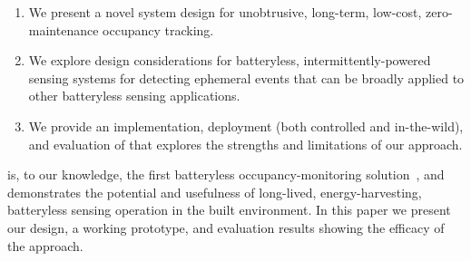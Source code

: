\begin{enumerate}[label=\arabic*., align=left, leftmargin=*]
	\item We present a novel system design for unobtrusive, long-term, low-cost, zero-maintenance occupancy tracking.
	\item We explore design considerations for batteryless, intermittently-powered sensing systems for detecting ephemeral events that can be broadly applied to other batteryless sensing applications.
	\item We provide an implementation, deployment (both controlled and in-the-wild), and evaluation of \sysname that explores the strengths and limitations of our approach. 
\end{enumerate}

\noind
\sysname is, to our knowledge, the first batteryless occupancy-monitoring solution~\cite{desai2018, sorber_tobias_2022}, and demonstrates the potential and usefulness of long-lived, energy-harvesting, batteryless sensing operation in the built environment. %
In this paper we present our design, a working prototype, and evaluation results showing the efficacy of the approach.


